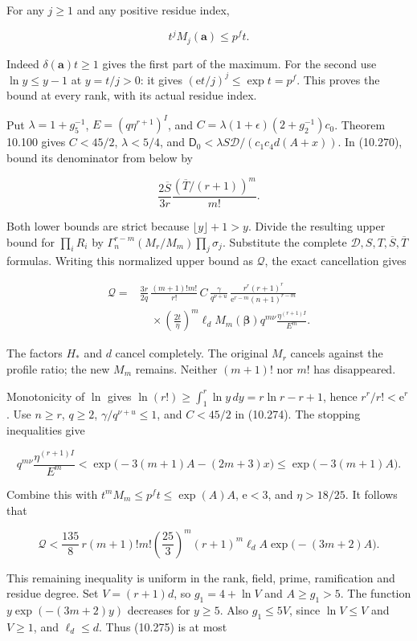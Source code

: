 \documentclass[
  11pt,
  a4paper,
]{article}
\begin{document}
For any \(j\ge1\) and any positive residue index,

\[
t^jM_j(\boldsymbol a)\le p^ft.
\]

Indeed \(\delta(\boldsymbol a)t\ge1\) gives the first part of the
maximum. For the second use \(\ln y\le y-1\) at \(y=t/j>0\): it gives
\((\mathrm e t/j)^j\le\exp t=p^f\). This proves the bound at every rank,
with its actual residue index.

Put \(\lambda=1+g_5^{-1}\), \(E=(q\eta^{r+1})^I\), and
\(C=\lambda(1+\epsilon)(2+g_2^{-1})c_0\). Theorem 10.100 gives
\(C<45/2\), \(\lambda<5/4\), and
\(\mathsf D_0<\lambda S\mathcal D/(c_1c_4d(A+x))\). In (10.270), bound
its denominator from below by

\[
\frac{2\overline S}{3r}
\frac{(\overline T/(r+1))^m}{m!}.
\]

Both lower bounds are strict because \(\lfloor y\rfloor+1>y\). Divide
the resulting upper bound for \(\prod_iR_i\) by
\(\Gamma_n^{r-m}(M_r/M_m)\prod_j\sigma_j\). Substitute the complete
\(\mathcal D,S,T,\overline S,\overline T\) formulas. Writing this
normalized upper bound as \(\mathcal Q\), the exact cancellation gives

\[
\begin{aligned}
\mathcal Q={}&\frac{3r}{2q}\,
\frac{(m+1)!m!}{r!}\,C\,
\frac{\gamma}{q^{\nu+u}}\,
\frac{r^r(r+1)^r}{\mathrm e^{r-m}(n+1)^{r-m}}\\
&\quad{}\times
\left(\frac{2t}{\eta}\right)^m
\ell_d M_m(\boldsymbol\beta)q^{m\nu}
\frac{\eta^{(r+1)I}}{E^m}.
\end{aligned}
\tag{10.274}
\]

The factors \(H_*\) and \(d\) cancel completely. The original \(M_r\)
cancels against the profile ratio; the new \(M_m\) remains. Neither
\((m+1)!\) nor \(m!\) has disappeared.

Monotonicity of \(\ln\) gives
\(\ln(r!)\ge\int_1^r\ln y\,dy=r\ln r-r+1\), hence
\(r^r/r!<\mathrm e^r\). Use \(n\ge r\), \(q\ge2\),
\(\gamma/q^{\nu+u}\le1\), and \(C<45/2\) in (10.274). The stopping
inequalities give

\[
q^{m\nu}\frac{\eta^{(r+1)I}}{E^m}
<\exp\bigl(-3(m+1)A-(2m+3)x\bigr)
\le\exp\bigl(-3(m+1)A\bigr).
\]

Combine this with \(t^mM_m\le p^ft\le\exp(A)A\), \(\mathrm e<3\), and
\(\eta>18/25\). It follows that

\[
\mathcal Q<\frac{135}{8}\,r(m+1)!m!
\left(\frac{25}{3}\right)^m(r+1)^m
\ell_d A\exp\bigl(-(3m+2)A\bigr).
\tag{10.275}
\]

This remaining inequality is uniform in the rank, field, prime,
ramification and residue degree. Set \(V=(r+1)d\), so \(g_1=4+\ln V\)
and \(A\ge g_1>5\). The function \(y\exp(-(3m+2)y)\) decreases for
\(y\ge5\). Also \(g_1\le5V\), since \(\ln V\le V\) and \(V\ge1\), and
\(\ell_d\le d\). Thus (10.275) is at most
\end{document}
